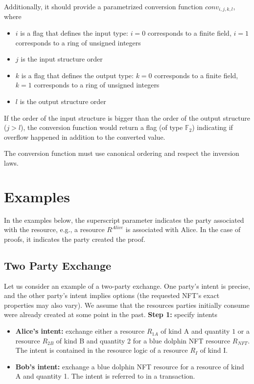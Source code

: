 Additionally, it should provide a parametrized conversion function $conv_{i,j,k,l}$, where
\begin{itemize}
    \item $i$ is a flag that defines the input type: $i = 0$ corresponds to a finite field, $i = 1$ corresponds to a ring of unsigned integers
    \item $j$ is the input structure order
    \item $k$ is a flag that defines the output type: $k = 0$ corresponds to a finite field, $k = 1$ corresponds to a ring of unsigned integers
    \item $l$ is the output structure order
    
\end{itemize}

If the order of the input structure is bigger than the order of the output structure ($j > l$), the conversion function would return a flag (of type $\mathbb{F}_2$) indicating if overflow happened in addition to the converted value.

The conversion function must use canonical ordering and respect the inversion laws.


\section{Examples}

In the examples below, the superscript parameter indicates the party associated with the resource, e.g., a resource $R^{Alice}$ is associated with Alice. In the case of proofs, it indicates the party created the proof.

\subsection{Two Party Exchange}

Let us consider an example of a two-party exchange. One party's intent is precise, and the other party's intent implies options (the requested NFT's exact properties may also vary). We assume that the resources parties initially consume were already created at some point in the past.
\hfill\break
\hfill\break
\textbf{Step 1:} specify intents

\begin{itemize}
    \item \textbf{Alice's intent:} exchange either a resource $R_{1A}$ of kind A and quantity $1$ or a resource $R_{2B}$ of kind B and quantity 2 for a blue dolphin NFT resource $R_{NFT}$. The intent is contained in the resource logic of a resource $R_{I}$ of kind I.
    \item \textbf{Bob's intent:} exchange a blue dolphin NFT resource for a resource of kind A and quantity 1. The intent is referred to in a transaction. 
\end{itemize}

